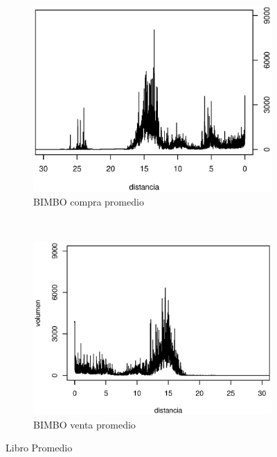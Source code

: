 \documentclass[11pt]{article}
\numberwithin{equation}{section} %
\begin{document}
\begin{figure}[htbp]
\centering
\begin{subfigure}[b]{0.5\textwidth}
\centering
\includegraphics[width=\textwidth, trim=0 0.5cm 0 1cm]{compraavg.eps}
\caption{BIMBO compra promedio}
\label{fig:compraavg}
\end{subfigure}%
~ %
\begin{subfigure}[b]{0.5\textwidth}
\centering
\includegraphics[width=\textwidth, trim=0 0.5cm 0 1cm]{ventaavg.eps}
\caption{BIMBO venta promedio}
\label{fig:ventavg}
\end{subfigure}

\caption{Libro Promedio}
\label{fig:bookavg}
\end{figure}
\end{document}
